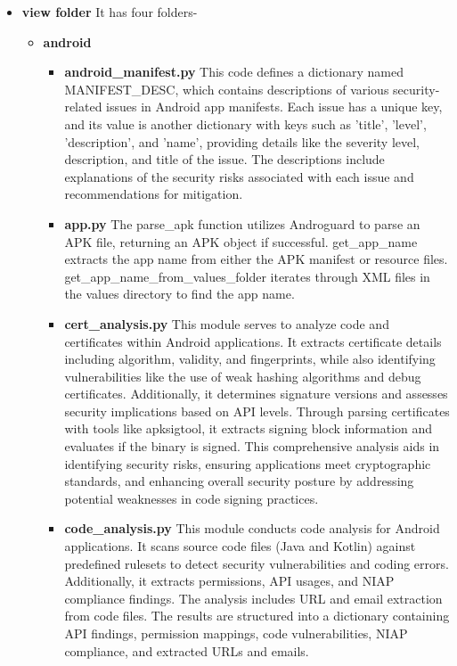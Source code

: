 \documentclass{report}
\begin{document}
\begin{itemize}
        \item \textbf{view folder}
        It has four folders-
        \begin{itemize}
            \item \textbf {android}
                \begin{itemize}
                    \item \textbf{android\_manifest.py}
                    This code defines a dictionary named MANIFEST\_DESC, which contains descriptions of various security-related issues in Android app manifests. Each issue has a unique key, and its value is another dictionary with keys such as 'title', 'level', 'description', and 'name', providing details like the severity level, description, and title of the issue. The descriptions include explanations of the security risks associated with each issue and recommendations for mitigation.
                    \item \textbf {app.py}
                    The parse\_apk function utilizes Androguard to parse an APK file, returning an APK object if successful. get\_app\_name extracts the app name from either the APK manifest or resource files. get\_app\_name\_from\_values\_folder iterates through XML files in the values directory to find the app name.
                    \item \textbf{cert\_analysis.py}
                    This module serves to analyze code and certificates within Android applications. It extracts certificate details including algorithm, validity, and fingerprints, while also identifying vulnerabilities like the use of weak hashing algorithms and debug certificates. Additionally, it determines signature versions and assesses security implications based on API levels. Through parsing certificates with tools like apksigtool, it extracts signing block information and evaluates if the binary is signed. This comprehensive analysis aids in identifying security risks, ensuring applications meet cryptographic standards, and enhancing overall security posture by addressing potential weaknesses in code signing practices.
                    \item \textbf{code\_analysis.py}
                    This module conducts code analysis for Android applications. It scans source code files (Java and Kotlin) against predefined rulesets to detect security vulnerabilities and coding errors. Additionally, it extracts permissions, API usages, and NIAP compliance findings. The analysis includes URL and email extraction from code files. The results are structured into a dictionary containing API findings, permission mappings, code vulnerabilities, NIAP compliance, and extracted URLs and emails.

\end{itemize}
\end{itemize}
\end{itemize}
\end{document}
